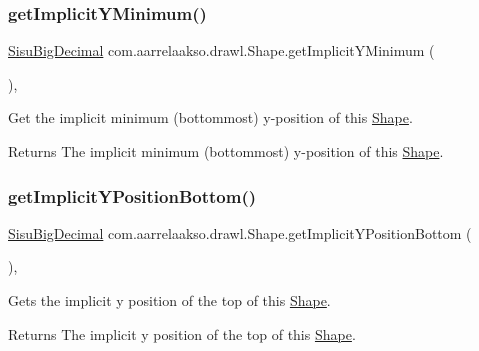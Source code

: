 \subsubsection{\texorpdfstring{get\+Implicit\+Y\+Minimum()}{getImplicitYMinimum()}}
{\footnotesize\ttfamily \hyperlink{classcom_1_1aarrelaakso_1_1drawl_1_1_sisu_big_decimal}{Sisu\+Big\+Decimal} com.\+aarrelaakso.\+drawl.\+Shape.\+get\+Implicit\+Y\+Minimum (\begin{DoxyParamCaption}{ }\end{DoxyParamCaption})\hspace{0.3cm}{\ttfamily [protected]}, {\ttfamily [inherited]}}

Get the implicit minimum (bottommost) y-\/position of this \hyperlink{classcom_1_1aarrelaakso_1_1drawl_1_1_shape}{Shape}.

\begin{DoxyReturn}{Returns}
The implicit minimum (bottommost) y-\/position of this \hyperlink{classcom_1_1aarrelaakso_1_1drawl_1_1_shape}{Shape}. 
\end{DoxyReturn}
\mbox{\label{classcom_1_1aarrelaakso_1_1drawl_1_1_shape_a5116673c093c60f66bba9fddf9533db6}} 
\subsubsection{\texorpdfstring{get\+Implicit\+Y\+Position\+Bottom()}{getImplicitYPositionBottom()}}
{\footnotesize\ttfamily \hyperlink{classcom_1_1aarrelaakso_1_1drawl_1_1_sisu_big_decimal}{Sisu\+Big\+Decimal} com.\+aarrelaakso.\+drawl.\+Shape.\+get\+Implicit\+Y\+Position\+Bottom (\begin{DoxyParamCaption}{ }\end{DoxyParamCaption})\hspace{0.3cm}{\ttfamily [protected]}, {\ttfamily [inherited]}}

Gets the implicit y position of the top of this \hyperlink{classcom_1_1aarrelaakso_1_1drawl_1_1_shape}{Shape}.

\begin{DoxyReturn}{Returns}
The implicit y position of the top of this \hyperlink{classcom_1_1aarrelaakso_1_1drawl_1_1_shape}{Shape}. 
\end{DoxyReturn}
\mbox{\label{classcom_1_1aarrelaakso_1_1drawl_1_1_shape_ad10def6c8dd7cbe03c281817406ab461}} 
